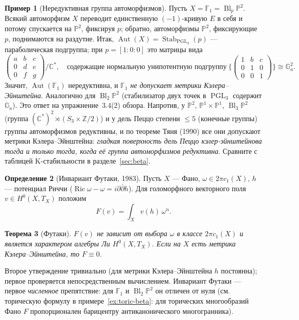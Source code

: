 \documentclass[11pt,a4paper]{article}
\theoremstyle{plain}
\newtheorem{theorem}{Теорема}[section]
\theoremstyle{definition}
\newtheorem{definition}[theorem]{Определение}
\newtheorem{example}[theorem]{Пример}
\theoremstyle{remark}
\renewcommand{\C}{\mathbb{C}}
\newcommand{\Z}{\mathbb{Z}}
\newcommand{\PP}{\mathbb{P}}
\DeclareMathOperator{\Bl}{Bl}
\DeclareMathOperator{\PGL}{PGL}
\DeclareMathOperator{\Aut}{Aut}
\DeclareMathOperator{\Stab}{Stab}
\DeclareMathOperator{\Ric}{Ric}
\begin{document}
\begin{example}[Нередуктивная группа автоморфизмов]\label{ex:Aut-F1}
Пусть $X=\mathbb F_1=\Bl_p\PP^2$. Всякий автоморфизм $X$ переводит единственную $(-1)$-кривую $E$ в
себя и потому спускается на $\PP^2$, фиксируя $p$; обратно, автоморфизмы $\PP^2$, фиксирующие $p$,
поднимаются на раздутие. Итак, $\Aut(X)=\Stab_{\PGL_3}(p)$ --- параболическая подгруппа; при
$p=[1:0:0]$ это матрицы вида
\[
\begin{pmatrix}a&b&c\\0&d&e\\0&f&g\end{pmatrix}\!\!\Big/\C^*,\quad\text{содержащие нормальную
унипотентную подгруппу}\ \Big\{\begin{pmatrix}1&b&c\\0&1&0\\0&0&1\end{pmatrix}\Big\}\cong\mathbb G_a^2 .
\]
Значит, $\Aut(\mathbb F_1)$ нередуктивна, и \emph{$\mathbb F_1$ не допускает метрики Кэлера--Эйнштейна}. Аналогично для
$\Bl_2\PP^2$ (стабилизатор двух точек в $\PGL_3$ содержит $\mathbb G_a$). Это ответ на упражнение~3.4(2)
обзора. Напротив, у $\PP^2$, $\PP^1\times\PP^1$, $\Bl_3\PP^2$ (группа $(\C^*)^2\rtimes(S_3\times\Z/2)$)
и у дель Пеццо степени $\le5$ (конечные группы) группы автоморфизмов редуктивны, и по теореме Тяня
(1990) все они допускают метрики Кэлера--Эйнштейна: \emph{гладкая поверхность дель Пеццо кэлер-эйнштейнова тогда и
только тогда, когда её группа автоморфизмов редуктивна}. Сравните с таблицей K-стабильности в
разделе~\ref{sec:beta}.
\end{example}

\begin{definition}[Инвариант Футаки, 1983]\label{def:Futaki-classical}
Пусть $X$ --- Фано, $\omega\in2\pi c_1(X)$, $h$ --- потенциал Риччи ($\Ric\omega-\omega=i\partial\bar\partial h$).
Для голоморфного векторного поля $v\in H^0(X,T_X)$ положим
\[
F(v)=\int_Xv(h)\,\omega^n .
\]
\end{definition}

\begin{theorem}[Футаки]\label{thm:Futaki-classical}
$F(v)$ не зависит от выбора $\omega$ в классе $2\pi c_1(X)$ и является характером алгебры Ли
$H^0(X,T_X)$. Если на $X$ есть метрика Кэлера--Эйнштейна, то $F\equiv0$.
\end{theorem}

Второе утверждение тривиально (для метрики Кэлера--Эйнштейна $h$ постоянна); первое проверяется непосредственным вычислением. Инвариант
Футаки --- первое \emph{численное} препятствие: для $\mathbb F_1$ и $\Bl_2\PP^2$ он отличен от нуля
(см. торическую формулу в примере~\ref{ex:toric-beta}: для торических многообразий Фано $F$
пропорционален барицентру антиканонического многогранника).
\end{document}
